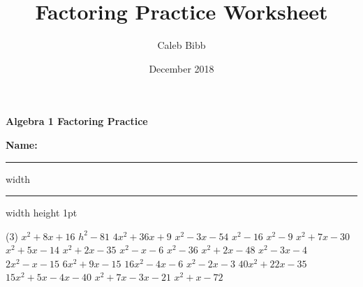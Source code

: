 \documentclass{article}
\title{Factoring Practice Worksheet}
\author{Caleb Bibb}
\date{December 2018}
\newcommand{\V}{\vspace{1in}}
\begin{document}
{\large\bfseries Algebra 1 \hfill  Factoring Practice}

\bigskip

{\bfseries Name: \underline{\hspace{3in}}}
\bigskip
\hrule width \hsize \kern 0.5mm \hrule width \hsize height 1pt
\begin{tasks}[style=enumerate](3)
\task $x^2 +8x +16$
\task $h^2 -81$
\task $4x^2 +36x +9$
\V
\task $x^2 -3x -54$
\task $x^2 -16$
\task $x^2 -9$
\V
\task $x^2 +7x -30$
\task $x^2 +5x -14$
\task $x^2 +2x -35$
\V
\task $x^2 -x -6$
\task $x^2 -36$
\task $x^2 +2x -48$
\V
\task $x^2 -3x -4$
\task $2x^2 -x -15$
\task $6x^2 +9x -15$
\V
\task $16x^2 -4x -6$
\task $x^2 -2x -3$
\task $40x^2 +22x - 35$
\V
\task $15x^2 +5x -4x -40$
\task $x^2 +7x -3x -21$
\task $x^2 +x -72$
\end{tasks}

\end{document}
